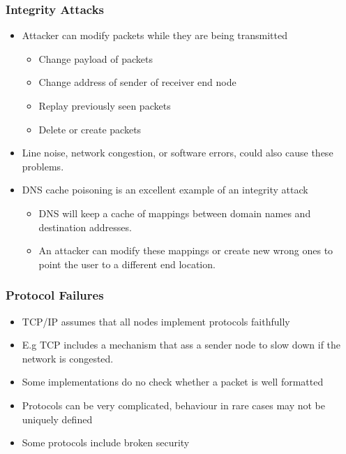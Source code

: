 \documentclass[twoside]{article}
\begin{document}
\subsubsection{Integrity Attacks}
\begin{itemize}
\item Attacker can modify packets while they are being transmitted
\begin{itemize}
\item Change  payload of packets
\item Change address of sender of receiver end node
\item Replay previously seen packets
\item Delete or create packets
\end{itemize}
\item Line noise, network congestion, or software errors, could also cause these problems.
\item DNS cache poisoning is an excellent example of an integrity attack
\begin{itemize}
\item DNS will keep a cache of mappings between domain names and destination addresses. 
\item An attacker can modify these mappings or create new wrong ones to point the user to a different end location. 
\end{itemize}
\end{itemize}

\subsubsection{Protocol Failures}
\begin{itemize}
\item TCP/IP assumes that all nodes implement protocols faithfully
\item E.g TCP includes a mechanism that ass a sender node to slow down if the network is congested. 
\item Some implementations do no check whether a packet is well formatted
\item Protocols can be very complicated, behaviour in rare cases may not be uniquely defined
\item Some protocols include broken security
\end{itemize}
\end{document}
